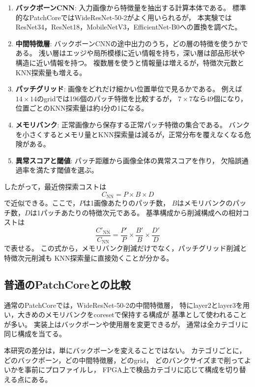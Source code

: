 \documentclass[uplatex,dvipdfmx,a4paper,11pt]{jsarticle}
\begin{document}
\begin{enumerate}
  \item \textbf{バックボーンCNN}: 入力画像から特徴量を抽出する計算本体である。
  標準的なPatchCoreではWideResNet-50-2がよく用いられるが，
  本実験ではResNet34，ResNet18，MobileNetV3，EfficientNet-B0への置換を調べた。

  \item \textbf{中間特徴層}: バックボーンCNNの途中出力のうち，どの層の特徴を使うかである。
  浅い層はエッジや局所模様に近い情報を持ち，深い層は部品形状や構造に近い情報を持つ。
  複数層を使うと情報量は増えるが，特徴次元数とKNN探索量も増える。

  \item \textbf{パッチグリッド}: 画像をどれだけ細かい位置単位で見るかである。
  例えば$14\times14$のgridでは196個のパッチ特徴を比較するが，
  $7\times7$なら49個になり，位置ごとのKNN探索量は約4分の1になる。

  \item \textbf{メモリバンク}: 正常画像から保存する正常パッチ特徴の集合である。
  バンクを小さくするとメモリ量とKNN探索量は減るが，正常分布を覆えなくなる危険がある。

  \item \textbf{異常スコアと閾値}: パッチ距離から画像全体の異常スコアを作り，
  欠陥誤通過率を満たす閾値を選ぶ。
\end{enumerate}

したがって，最近傍探索コストは
\[
  C_{\mathrm{NN}} = P \times B \times D
\]
で近似できる。ここで，$P$は1画像あたりのパッチ数，
$B$はメモリバンクのパッチ数，$D$は1パッチあたりの特徴次元である。
基準構成から削減構成への相対コストは
\[
  \frac{C'_{\mathrm{NN}}}{C_{\mathrm{NN}}}
  =
  \frac{P'}{P}
  \times
  \frac{B'}{B}
  \times
  \frac{D'}{D}
\]
で表せる。
この式から，メモリバンク削減だけでなく，パッチグリッド削減と特徴次元削減も
KNN探索量に直接効くことが分かる。

\subsection{普通のPatchCoreとの比較}

通常のPatchCoreでは，WideResNet-50-2の中間特徴層，
特にlayer2とlayer3を用い，大きめのメモリバンクをcoresetで保持する構成が
基準として使われることが多い。
実装上はバックボーンや使用層を変更できるが，
通常は全カテゴリに同じ構成を当てる。

本研究の差分は，単にバックボーンを変えることではない。
カテゴリごとに，どのバックボーン，どの中間特徴層，どのgrid，
どのバンクサイズまで削ってよいかを事前にプロファイルし，
FPGA上で検品カテゴリに応じて構成を切り替える点にある。
\end{document}
